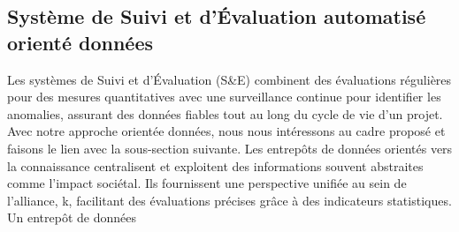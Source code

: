 \subsection{Système de Suivi et d'Évaluation automatisé orienté données}
Les systèmes de Suivi et d'Évaluation (S\&E) combinent des évaluations régulières pour des mesures quantitatives avec une surveillance continue pour identifier les anomalies, assurant des données fiables tout au long du cycle de vie d'un projet. Avec notre approche orientée données, nous nous intéressons au cadre proposé et faisons le lien avec la sous-section suivante.
Les entrepôts de données orientés vers la connaissance centralisent et exploitent des informations souvent abstraites comme l'impact sociétal. Ils fournissent une perspective unifiée au sein de l'alliance, k, facilitant des évaluations précises grâce à des indicateurs statistiques. Un entrepôt de données 